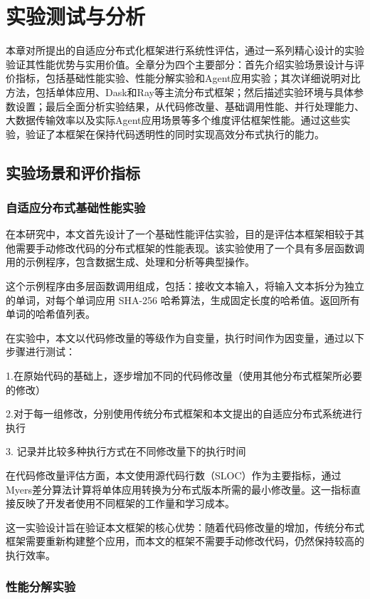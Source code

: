 \chapter{实验测试与分析}

本章对所提出的自适应分布式化框架进行系统性评估，通过一系列精心设计的实验验证其性能优势与实用价值。全章分为四个主要部分：首先介绍实验场景设计与评价指标，包括基础性能实验、性能分解实验和Agent应用实验；其次详细说明对比方法，包括单体应用、Dask和Ray等主流分布式框架；然后描述实验环境与具体参数设置；最后全面分析实验结果，从代码修改量、基础调用性能、并行处理能力、大数据传输效率以及实际Agent应用场景等多个维度评估框架性能。通过这些实验，验证了本框架在保持代码透明性的同时实现高效分布式执行的能力。

\section{实验场景和评价指标}
\label{sec:exp_setting}
\subsection{自适应分布式基础性能实验}
在本研究中，本文首先设计了一个基础性能评估实验，目的是评估本框架相较于其他需要手动修改代码的分布式框架的性能表现。该实验使用了一个具有多层函数调用的示例程序，包含数据生成、处理和分析等典型操作。

这个示例程序由多层函数调用组成，包括：接收文本输入，将输入文本拆分为独立的单词，对每个单词应用 SHA-256 哈希算法，生成固定长度的哈希值。返回所有单词的哈希值列表。

在实验中，本文以代码修改量的等级作为自变量，执行时间作为因变量，通过以下步骤进行测试：

1.在原始代码的基础上，逐步增加不同的代码修改量（使用其他分布式框架所必要的修改）

2.对于每一组修改，分别使用传统分布式框架和本文提出的自适应分布式系统进行执行

3. 记录并比较多种执行方式在不同修改量下的执行时间

在代码修改量评估方面，本文使用源代码行数（SLOC）作为主要指标，通过Myers差分算法\cite{myers1986nd}计算将单体应用转换为分布式版本所需的最小修改量。这一指标直接反映了开发者使用不同框架的工作量和学习成本。

这一实验设计旨在验证本文框架的核心优势：随着代码修改量的增加，传统分布式框架需要重新构建整个应用，而本文的框架不需要手动修改代码，仍然保持较高的执行效率。

\subsection{性能分解实验}{}

